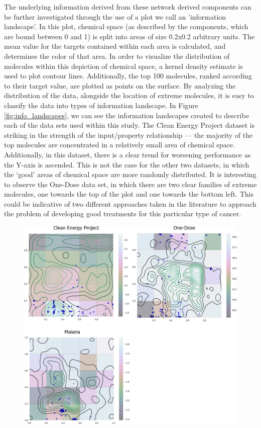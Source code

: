 \documentclass{pnastwo}
\begin{document}
\begin{article}
The underlying information derived from these network derived components can be further investigated through the use of a plot we call an 'information landscape'.  In this plot, chemical space (as described by the components, which are bound between 0 and 1) is split into areas of size 0.2x0.2 arbitrary units. The mean value for the targets contained within each area is calculated, and determines the color of that area.  In order to visualize the distribution of molecules within this depiction of chemical space, a kernel density estimate is used to plot contour lines.  Additionally, the top 100 molecules, ranked according to their target value, are plotted as points on the surface.  By analyzing the distribution of the data, alongside the location of extreme molecules, it is easy to classify the data into types of information landscape.  In Figure \ref{fig:info_landscapes}, we can see the information landscapes created to describe each of the data sets used within this study.  The Clean Energy Project dataset is striking in the strength of the input/property relationship --- the majority of the top molecules are concentrated in a relatively small area of chemical space.  Additionally, in this dataset, there is a clear trend for worsening performance as the Y-axis is ascended.  This is not the case for the other two datasets, in which the `good' areas of chemical space are more randomly distributed.  It is interesting to observe the One-Dose data set, in which there are two clear families of extreme molecules, one towards the top of the plot and one towards the bottom left.  This could be indicative of two different approaches taken in the literature to approach the problem of developing good treatments for this particular type of cancer. 
\begin{figure}[htb]
\centering
\includegraphics[width=\columnwidth]{figures/info_landscape-tile/info_landscape-tile.png}

\end{figure}
\end{article}
\end{document}
